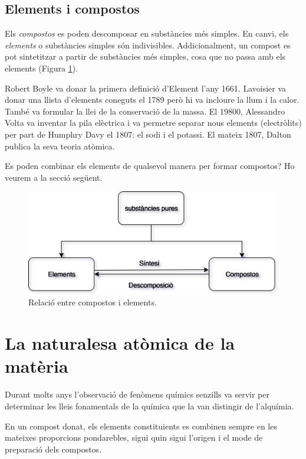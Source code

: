 \subsection{Elements i compostos}

Els \emph{compostos} es poden descomposar en substàncies més simples. En canvi, els \emph{elements} o substàncies simples són indivisibles. Addicionalment, un compost es pot sintetitzar a partir de substàncies més simples, cosa que no passa amb els elements (Figura \ref{fig:CompostosElements}). 

Robert Boyle va donar la primera definició d'Element l'any 1661. Lavoisier va donar una llista d'elements coneguts el 1789 però hi va incloure la llum i la calor. També va formular la llei de la conservació de la massa. El 19800, Alessandro Volta va inventar la pila elèctrica i va permetre separar nous elements (electròlits) per part de Humphry Davy el 1807: el sodi i el potassi. El mateix 1807, Dalton publica la seva teoria atòmica.

Es poden combinar els elements de qualsevol manera per formar compostos? Ho veurem a la secció següent.

\begin{figure}[h]
\centering
\includegraphics[scale=0.8]{figures/CompostosElements.png}
\caption{Relació entre compostos i elements.}
\label{fig:CompostosElements}
\end{figure}


\section{La naturalesa atòmica de la matèria}

Durant molts anys l'observació de fenòmens químics senzills va servir per determinar les lleis fonamentals de la química que la van distingir de l'alquímia.

\begin{mdframed}[backgroundcolor=gray!30,frametitle=Llei de les proporcions definides]
En un compost donat, els elements constituients es combinen sempre en les mateixes proporcions pondarebles, sigui quin sigui l'origen i el mode de preparació dels compostos.
\end{mdframed}

